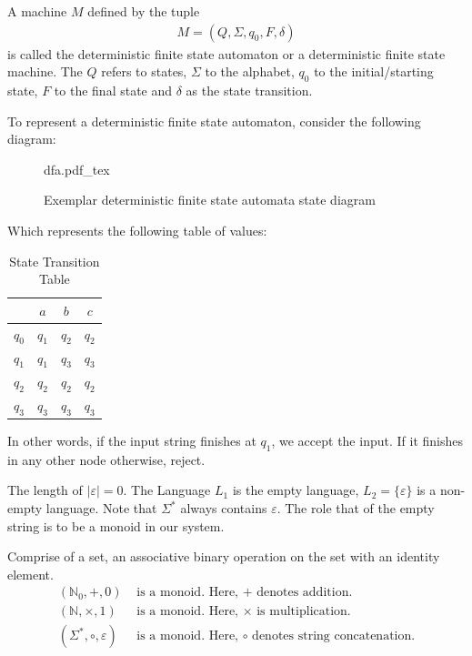 \documentclass[a4paper]{article}
\newcommand{\incfig}[2][1]{%
    \def\svgwidth{#1\columnwidth}
    {#2.pdf_tex}
}
\theoremstyle{plain}
\theoremstyle{definition}
\newtheorem{defn}{Definition}[section]
\theoremstyle{remark}
\begin{document}
	\begin{tcolorbox}[colback=black!3!white,colframe=black!60!white,title=\begin{defn}Deterministic Finate State Automaton \label{Deterministic Finate State Automaton}\end{defn}]
	A machine $M$ defined by the tuple
	\begin{align}
	M = (Q,\Sigma,q_0,F,\delta)
	\end{align}
	is called the deterministic finite state automaton or a deterministic finite state machine. The $Q$ refers to states, $\Sigma$ to the alphabet,  $q_0$ to the initial/starting state, $F$ to the final state and $\delta$ as the state transition.
	\end{tcolorbox}
	To represent a deterministic finite state automaton, consider the following diagram:
\begin{figure}[H]
    \centering
    \incfig{dfa}
    \caption{Exemplar deterministic finite state automata state diagram}
    \label{fig:dfa}
\end{figure}
Which represents the following table of values:
\begin{table}[H]
	\centering
	\caption{State Transition Table}
	\label{tab:label}
	\begin{tabular}{|c||c|c|c|}
		\hline
		\delta & $a$ & $b$ & $c$ \\
		\hline
		\hline
		$q_0$ & $q_1$ & $q_2$ & $q_2$ \\
		\hline
		$q_1$ & $q_1$ & $q_3$ & $q_3 $ \\
		\hline
		$q_2$ & $q_2$ & $q_2$ & $q_2$ \\
		\hline
		$q_3$ & $q_3$ & $q_3$ & $ q_3$ \\
		\hline
	\end{tabular}
\end{table}
In other words, if the input string finishes at $q_1$, we accept the input. If it finishes in any other node otherwise, reject.
\begin{tcolorbox}[colback=black!3!white,colframe=black!60!white,title=\begin{defn}The Empty Word \label{The Empty Word}\end{defn}]
The length of $|\varepsilon| = 0$. The Language $L_1$ is the empty language, $L_2 = \{ \varepsilon\}$ is a non-empty language. Note that $\Sigma^{*}$ always contains $\varepsilon$. The role that of the empty string is to be a monoid in our system.
\end{tcolorbox}
\begin{tcolorbox}[colback=black!3!white,colframe=black!60!white,title=\begin{defn}Monoid \label{Monoid}\end{defn}]
Comprise of a set, an associative binary operation on the set with an identity element.
\begin{align}
	(\mathbb{N}_0, + ,0) & \text{ is a monoid. Here, $+$ denotes addition.} \\
	(\mathbb{N},\times ,1) &\text{ is a monoid. Here, $\times $ is multiplication.}\\
	(\Sigma^{*},\circ,\varepsilon) & \text{ is a monoid. Here, $\circ$ denotes string concatenation.}
\end{align}
\end{tcolorbox}
\end{document}
